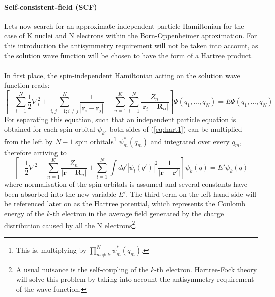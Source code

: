 \paragraph{Self-consistent-field (SCF)} Lets now search for an approximate independent particle Hamiltonian for the case of K nuclei and N electrons within the Born-Oppenheimer aproximation. For this introduction the antisymmetry requirement will not be taken into account, as the solution wave function will be chosen to have the form of a Hartree product.\\\\
In first place, the spin-independent Hamiltonian acting on the solution wave function reads:%
\begin{equation}
    \left[-\sum_{i=1}^N\frac{1}{2}\nabla_i^2+
    \sum_{i,j=1;i\neq j}^N \frac{1}{\left|\mathbf{r}_i -\mathbf{r}_j\right|} - 
    \sum_{n=1}^K\sum_{i=1}^N \frac{Z_n}{\left|\mathbf{r}_i -\mathbf{R}_n\right|}\right]\Psi (q_1,...,q_N) = E \Psi (q_1,...,q_N)
    \label{eq:hart1}
\end{equation}
For separating this equation, such that an independent particle equation is obtained for each spin-orbital $\psi_k$, both sides of (\ref{eq:hart1}) can be multiplied from the left by $N-1$ spin orbitals\footnote{This is, multiplying by $\prod_{m\neq k}^N\psi_m^* (q_m)$.} $\psi_m^* (q_m)$ and integrated over every $q_m$, therefore arriving to%
\begin{equation}
    \left[-\frac{1}{2}\nabla^2 - 
    \sum_{n=1}^K \frac{Z_n}{\left|\mathbf{r} -\mathbf{R}_n\right|} + 
    \sum_{l=1}^N \int{dq'\left|\psi_l(q')\right|^2\frac{1}{\left|\mathbf{r} -\mathbf{r'}\right|}}\right]\psi_k (q) = E' \psi_k (q)
    \label{eq:hart2}
\end{equation}
where normalisation of the spin orbitals is assumed and several constants have been absorbed into the new variable $E'$. The third term on the left hand side will be referenced later on as the Hartree potential, which represents the Coulomb energy of the $k$-th electron in the average field generated by the charge distribution caused by all the N electrons\footnote{A usual nuisance is the self-coupling of the $k$-th electron. Hartree-Fock theory will solve this problem by taking into account the antisymmetry requirement of the wave function.}.

